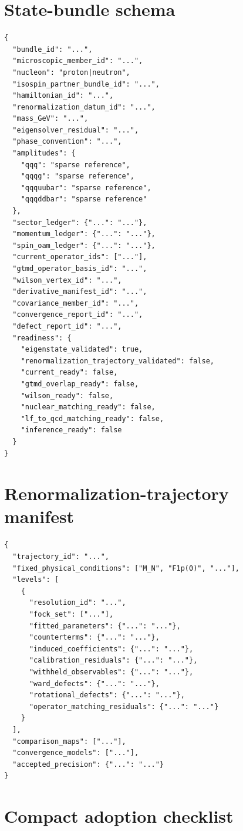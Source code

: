 \documentclass[11pt]{article}
\begin{document}
\section{State-bundle schema}
\label{app:bundle-schema}

\begin{verbatim}
{
  "bundle_id": "...",
  "microscopic_member_id": "...",
  "nucleon": "proton|neutron",
  "isospin_partner_bundle_id": "...",
  "hamiltonian_id": "...",
  "renormalization_datum_id": "...",
  "mass_GeV": "...",
  "eigensolver_residual": "...",
  "phase_convention": "...",
  "amplitudes": {
    "qqq": "sparse reference",
    "qqqg": "sparse reference",
    "qqquubar": "sparse reference",
    "qqqddbar": "sparse reference"
  },
  "sector_ledger": {"...": "..."},
  "momentum_ledger": {"...": "..."},
  "spin_oam_ledger": {"...": "..."},
  "current_operator_ids": ["..."],
  "gtmd_operator_basis_id": "...",
  "wilson_vertex_id": "...",
  "derivative_manifest_id": "...",
  "covariance_member_id": "...",
  "convergence_report_id": "...",
  "defect_report_id": "...",
  "readiness": {
    "eigenstate_validated": true,
    "renormalization_trajectory_validated": false,
    "current_ready": false,
    "gtmd_overlap_ready": false,
    "wilson_ready": false,
    "nuclear_matching_ready": false,
    "lf_to_qcd_matching_ready": false,
    "inference_ready": false
  }
}
\end{verbatim}

\section{Renormalization-trajectory manifest}
\label{app:trajectory-schema}

\begin{verbatim}
{
  "trajectory_id": "...",
  "fixed_physical_conditions": ["M_N", "F1p(0)", "..."],
  "levels": [
    {
      "resolution_id": "...",
      "fock_set": ["..."],
      "fitted_parameters": {"...": "..."},
      "counterterms": {"...": "..."},
      "induced_coefficients": {"...": "..."},
      "calibration_residuals": {"...": "..."},
      "withheld_observables": {"...": "..."},
      "ward_defects": {"...": "..."},
      "rotational_defects": {"...": "..."},
      "operator_matching_residuals": {"...": "..."}
    }
  ],
  "comparison_maps": ["..."],
  "convergence_models": ["..."],
  "accepted_precision": {"...": "..."}
}
\end{verbatim}

\section{Compact adoption checklist}
\label{app:checklist}
\end{document}
